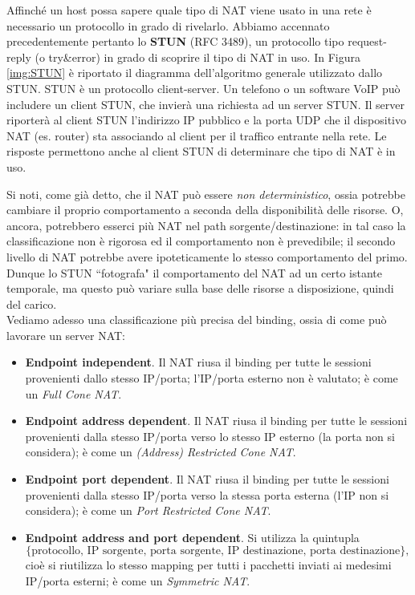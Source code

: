 Affinché un host possa sapere quale tipo di NAT viene usato in una rete è necessario un protocollo in grado di rivelarlo. Abbiamo accennato precedentemente pertanto lo \textbf{STUN} (RFC 3489), un protocollo tipo request-reply (o try\&error) in grado di scoprire il tipo di NAT in uso. In Figura \ref{img:STUN} è riportato il diagramma dell'algoritmo generale utilizzato dallo STUN. STUN è un protocollo client-server. Un telefono o un software VoIP può includere un client STUN, che invierà una richiesta ad un server STUN. Il server riporterà al client STUN l'indirizzo IP pubblico e la porta UDP che il dispositivo NAT (es. router) sta associando al client per il traffico entrante nella rete. Le risposte permettono anche al client STUN di determinare che tipo di NAT è in uso.

Si noti, come già detto, che il NAT può essere \textit{non deterministico}, ossia potrebbe cambiare il proprio comportamento a seconda della disponibilità delle risorse. O, ancora, potrebbero esserci più NAT nel path sorgente/destinazione: in tal caso la classificazione non è rigorosa ed il comportamento non è prevedibile; il secondo livello di NAT potrebbe avere ipoteticamente lo stesso comportamento del primo. Dunque lo STUN \textquotedblleft fotografa" il comportamento del NAT ad un certo istante temporale, ma questo può variare sulla base delle risorse a disposizione, quindi del carico.\\
Vediamo adesso una classificazione più precisa del binding, ossia di come può lavorare un server NAT:
\begin{itemize}
	\item \textbf{Endpoint independent}. Il NAT riusa il binding per tutte le sessioni provenienti dallo stesso IP/porta; l'IP/porta esterno non è valutato; è come un \textit{Full Cone NAT}.
	
	\item \textbf{Endpoint address dependent}. Il NAT riusa il binding per tutte le sessioni provenienti dalla stesso IP/porta verso lo stesso IP esterno (la porta non si considera); è come un \textit{(Address) Restricted Cone NAT}.
	
	\item \textbf{Endpoint port dependent}. Il NAT riusa il binding per tutte le sessioni provenienti dalla stesso IP/porta verso la stessa porta esterna (l'IP non si considera); è come un \textit{Port Restricted Cone NAT}.
		
	\item \textbf{Endpoint address and port dependent}. Si utilizza la quintupla $$\{\text{protocollo, IP sorgente, porta sorgente, IP destinazione, porta destinazione}\},$$ cioè si riutilizza lo stesso mapping per tutti i pacchetti inviati ai medesimi IP/porta esterni; è come un \textit{Symmetric NAT}.
	
\end{itemize}
